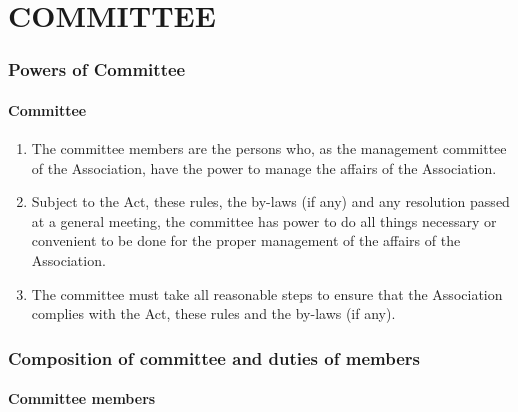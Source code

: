 \documentclass[../constitution.tex]{subfiles}
\begin{document}
\hypertarget{part-5-committee}{%
  \part{COMMITTEE}\label{part-5-committee}}

\hypertarget{division-1-powers-of-committee}{%
  \section{Powers of Committee}\label{division-1-powers-of-committee}}

\hypertarget{committee}{%
  \subsection{Committee}\label{committee}}

\begin{enumerate}

  \item The committee members are the persons who, as the management committee of the Association, have the power to manage the affairs of the Association.
  \item Subject to the Act, these rules, the by-laws (if any) and any resolution passed at a general meeting, the committee has power to do all things necessary or convenient to be done for the proper management of the affairs of the Association.
  \item The committee must take all reasonable steps to ensure that the Association complies with the Act, these rules and the by-laws (if any).
\end{enumerate}

\hypertarget{division-2-composition-of-committee-and-duties-of-members}{%
  \section{Composition of committee and duties of members}\label{division-2-composition-of-committee-and-duties-of-members}}

\hypertarget{committee-members}{%
  \subsection{Committee members}\label{committee-members}}
\end{document}

